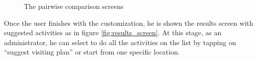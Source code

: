 \documentclass[11pt,a4paper,oneside]{article}
\begin{document}
\begin{figure}[H]
    \centering
    \qquad
    \qquad
    \caption{The pairwise comparison screens }%
    \label{fig:info_screens}%
\end{figure}

Once the user finishes with the customization, he is shown the results screen with suggested activities as in figure \ref{fig:results_screen}. At this stage, as an administrator, he can select to do all the activities on the list by tapping on “suggest visiting plan” or start from one specific location. 
\end{document}
